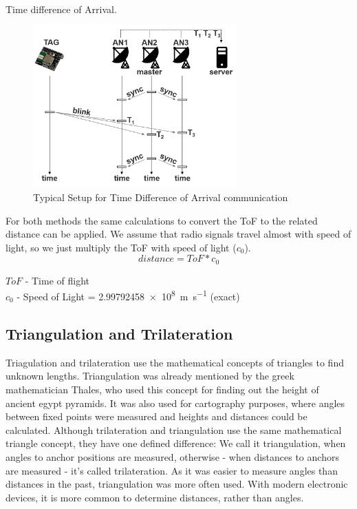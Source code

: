 Time difference of Arrival.
\cite{SewioTDOA}

\begin{figure}[th]
\centering
\includegraphics[width=0.7\textwidth]{Figures/time_difference_of_arrival}
\decoRule
\caption[Time Difference of Arrival]{Typical Setup for Time Difference of Arrival communication}
\label{fig:time_difference_of_arrival}
\end{figure}


For both methods the same calculations to convert the ToF to the related distance can be applied. We assume that radio signals travel almost with speed of light, so we just multiply the ToF with speed of light ($c_{0}$).
$$ distance = ToF * c_{0} $$

$ToF$ - Time of flight\\
$c_{0}$ - Speed of Light = \SI{2.99792458e8}{\meter\per\second} (exact) \\

\subsection{Triangulation and Trilateration}
Triagulation and trilateration use the mathematical concepts of triangles to find unknown lengths. Triangulation was already mentioned by the greek mathematician Thales, who used this concept for finding out the height of ancient egypt pyramids. \cite{thales} It was also used for cartography purposes, where angles between fixed points were measured and heights and distances could be calculated. 
Although trilateration and triangulation use the same mathematical triangle concept, they have one defined difference: We call it triangulation, when angles to anchor positions are measured, otherwise - when distances to anchors are measured - it's called trilateration.
As it was easier to measure angles than distances in the past, triangulation was more often used. With modern electronic devices, it is more common to determine distances, rather than angles. 

